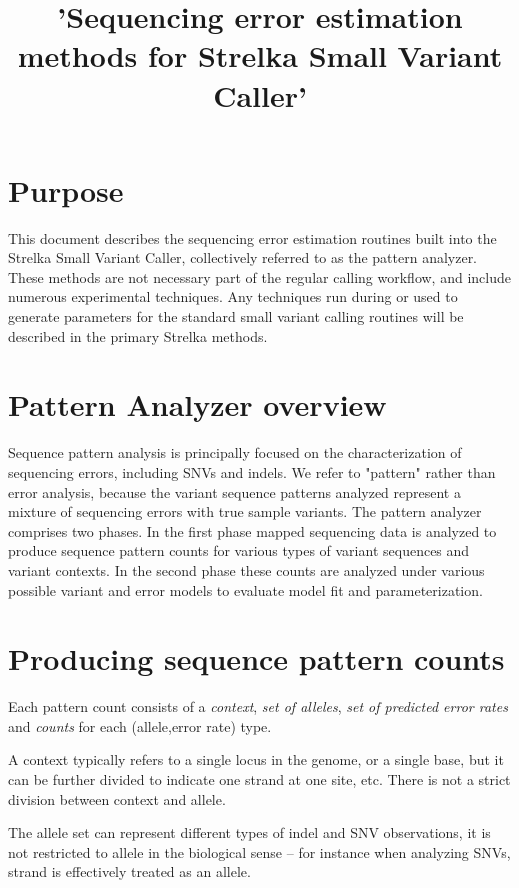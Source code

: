 \documentclass{article}
\title{'Sequencing error estimation methods for Strelka Small Variant Caller'}
\begin{document}
\maketitle

\tableofcontents

\section{Purpose}

This document describes the sequencing error estimation routines built into the Strelka Small Variant Caller, collectively referred to as the pattern analyzer. These methods are not necessary part of the regular calling workflow, and include numerous experimental techniques. Any techniques run during or used to generate parameters for the standard small variant calling routines will be described in the primary Strelka methods.

\section{Pattern Analyzer overview}

Sequence pattern analysis is principally focused on the characterization of sequencing errors, including SNVs and indels. We refer to "pattern" rather than error analysis, because the variant sequence patterns analyzed represent a mixture of sequencing errors with true sample variants. The pattern analyzer comprises two phases. In the first phase mapped sequencing data is analyzed to produce sequence pattern counts for various types of variant sequences and variant contexts. In the second phase these counts are analyzed under various possible variant and error models to evaluate model fit and parameterization.

\section{Producing sequence pattern counts}

Each pattern count consists of a \emph{context}, \emph{set of alleles}, \emph{set of predicted error rates} and \emph{counts} for each (allele,error rate) type.

A context typically refers to a single locus in the genome, or a single base, but it can be further divided to indicate one strand at one site, etc. There is not a strict division between context and allele.

The allele set can represent different types of indel and SNV observations, it is not restricted to allele in the biological sense -- for instance when analyzing SNVs, strand is effectively treated as an allele.
\end{document}
